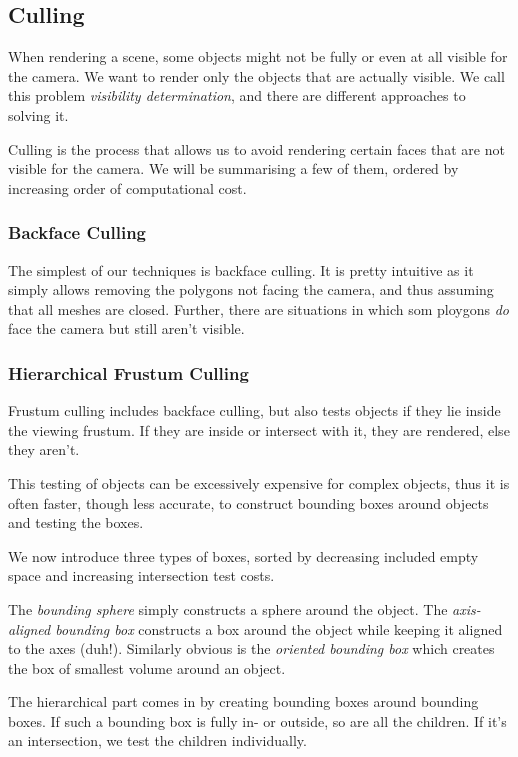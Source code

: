 \documentclass[english]{panikzettel}
\begin{document}
\subsection{Culling}

When rendering a scene, some objects might not be fully or even at all visible for the camera. We want to render only the objects that are actually visible. We call this problem \emph{visibility determination}, and there are different approaches to solving it.

Culling is the process that allows us to avoid rendering certain faces that are not visible for the camera. We will be summarising a few of them, ordered by increasing order of computational cost.

\subsubsection*{Backface Culling}

The simplest of our techniques is backface culling. It is pretty intuitive as it simply allows removing the polygons not facing the camera, and thus assuming that all meshes are closed. Further, there are situations in which som ploygons \emph{do} face the camera but still aren't visible.

\subsubsection*{Hierarchical Frustum Culling}

Frustum culling includes backface culling, but also tests objects if they lie inside the viewing frustum. If they are inside or intersect with it, they are rendered, else they aren't.

This testing of objects can be excessively expensive for complex objects, thus it is often faster, though less accurate, to construct bounding boxes around objects and testing the boxes.

We now introduce three types of boxes, sorted by decreasing included empty space and increasing intersection test costs.

The \emph{bounding sphere} simply constructs a sphere around the object. The \emph{axis-aligned bounding box} constructs a box around the object while keeping it aligned to the axes (duh!). Similarly obvious is the \emph{oriented bounding box} which creates the box of smallest volume around an object.

The hierarchical part comes in by creating bounding boxes around bounding boxes. If such a bounding box is fully in- or outside, so are all the children. If it's an intersection, we test the children individually.
\end{document}
